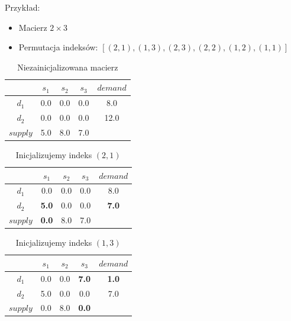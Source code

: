 \documentclass{beamer}
\begin{document}
\begin{frame}
 {
    Przykład:
    \begin{itemize}
        \item Macierz $2 \times 3$
        \item Permutacja indeksów: $[(2,1),(1,3),(2,3),(2,2),(1,2),(1,1)]$
    \end{itemize}
}
 {
    \begin{table}
        \begin{center}
            \begin{tabular}{c||ccc||c}
                & $s_1$ & $s_2$ & $s_3$ & $demand$ \\ 
                \hline
                \hline
                $d_1$ & 0.0 & 0.0 & 0.0 & 8.0 \\
                $d_2$ & 0.0 & 0.0 & 0.0 & 12.0 \\
                \hline
                \hline
                $supply$ & 5.0 & 8.0 & 7.0 & \\ 
            \end{tabular}
        \end{center}
        \caption{Niezainicjalizowana macierz}
    \end{table}
}

 {
    \begin{table}
        \begin{center}
            \begin{tabular}{c||ccc||c}
                & $s_1$ & $s_2$ & $s_3$ & $demand$ \\ 
                \hline
                \hline
                $d_1$ & 0.0 & 0.0 & 0.0 & 8.0 \\
                $d_2$ & \textbf{5.0} & 0.0 & 0.0 & \textbf{7.0} \\
                \hline
                \hline
                $supply$ & \textbf{0.0} & 8.0 & 7.0 & \\ 
            \end{tabular}
        \end{center}
        \caption{Inicjalizujemy indeks $(2,1)$}
    \end{table}
}

 {
    \begin{table}
        \begin{center}
            \begin{tabular}{c||ccc||c}
                & $s_1$ & $s_2$ & $s_3$ & $demand$ \\ 
                \hline
                \hline
                $d_1$ & 0.0 & 0.0 & \textbf{7.0} & \textbf{1.0} \\
                $d_2$ & 5.0 & 0.0 & 0.0 & 7.0 \\
                \hline
                \hline
                $supply$ & 0.0 & 8.0 & \textbf{0.0} & \\ 
            \end{tabular}
        \end{center}
        \caption{Inicjalizujemy indeks $(1,3)$}
    \end{table}
}


\end{frame}
\end{document}
